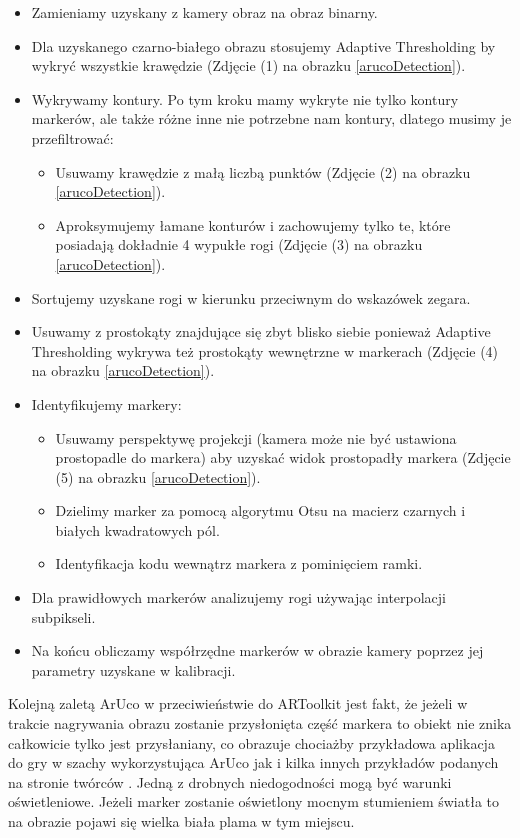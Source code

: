 \begin{itemize}
	\item Zamieniamy uzyskany z kamery obraz na obraz binarny.
	\item Dla uzyskanego czarno-białego obrazu stosujemy Adaptive Thresholding by wykryć wszystkie krawędzie (Zdjęcie (1) na obrazku \ref{arucoDetection}).
	\item Wykrywamy kontury. Po tym kroku mamy wykryte nie tylko kontury markerów, ale także różne inne nie potrzebne nam kontury, dlatego musimy je przefiltrować:
	\begin{itemize}
		\item Usuwamy krawędzie z małą liczbą punktów (Zdjęcie (2) na obrazku \ref{arucoDetection}).
		\item Aproksymujemy łamane konturów i zachowujemy tylko te, które posiadają dokładnie 4 wypukłe rogi (Zdjęcie (3) na obrazku \ref{arucoDetection}).
	\end{itemize}

	\item Sortujemy uzyskane rogi w kierunku przeciwnym do wskazówek zegara.
	\item Usuwamy z prostokąty znajdujące się zbyt blisko siebie ponieważ Adaptive Thresholding wykrywa też prostokąty wewnętrzne w markerach (Zdjęcie (4) na obrazku \ref{arucoDetection}).
	\item Identyfikujemy markery:
	\begin{itemize}
		\item Usuwamy perspektywę projekcji (kamera może nie być ustawiona prostopadle do markera) aby uzyskać widok prostopadły markera (Zdjęcie (5) na obrazku \ref{arucoDetection}).
		\item Dzielimy marker za pomocą algorytmu Otsu na macierz czarnych i białych kwadratowych pól.
		\item Identyfikacja kodu wewnątrz markera z pominięciem ramki.
	\end{itemize}

	\item Dla prawidłowych markerów analizujemy rogi używając interpolacji subpikseli.
	\item Na końcu obliczamy współrzędne markerów w obrazie kamery poprzez jej parametry uzyskane w kalibracji.
\end{itemize}

Kolejną zaletą ArUco w przeciwieństwie do ARToolkit jest fakt, że jeżeli w trakcie nagrywania obrazu zostanie przysłonięta część markera to obiekt nie znika całkowicie tylko jest przysłaniany, co obrazuje chociażby przykładowa aplikacja do gry w szachy wykorzystująca ArUco \cite{AugmentedRealityChess} jak i kilka innych przykładów podanych na stronie twórców \cite{ArUco}. Jedną z drobnych niedogodności mogą być warunki oświetleniowe. Jeżeli marker zostanie oświetlony mocnym stumieniem światła to na obrazie pojawi się wielka biała plama w tym miejscu.

